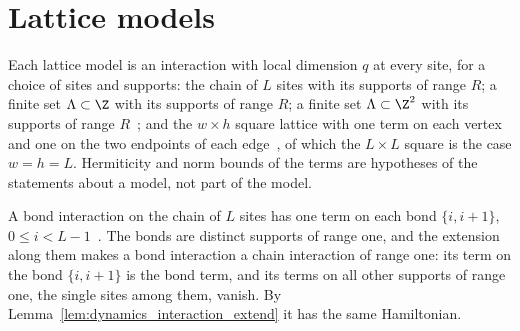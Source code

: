 \section{Lattice models}
\label{sec:hamiltonians_models}

\begin{definition}
    \label{def:hamiltonians_models}
    \leanok
    Each lattice model is an interaction with local dimension $q$ at every site,
    for a choice of sites and supports: the chain of $L$ sites with its supports
    of range $R$; a finite set $\Lambda\subset\Z$ with its supports of range $R$;
    a finite set $\Lambda\subset\Z^2$ with its supports of range
    $R$~\cite{OpenAI2026AreaLaw}; and the $w\times h$ square lattice with one term
    on each vertex and one on the two endpoints of each
    edge~\cite{OpenAI2026PolynomialPEPS}, of which the $L\times L$ square is the
    case $w=h=L$. Hermiticity and norm bounds of the terms are hypotheses of the
    statements about a model, not part of the model.
\end{definition}

\begin{definition}
    \label{def:hamiltonians_bond_interaction}
    \leanok
    A bond interaction on the chain of $L$ sites has one term on each bond $\{i,i+1\}$,
    $0\le i<L-1$~\cite{Landau2013PolynomialTime}. The bonds are distinct supports of
    range one, and the extension along them makes a bond interaction a chain
    interaction of range one: its term on the bond $\{i,i+1\}$ is the bond term, and
    its terms on all other supports of range one, the single sites among them, vanish.
    By Lemma~\ref{lem:dynamics_interaction_extend} it has the same Hamiltonian.
\end{definition}

